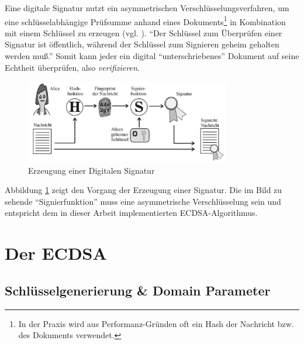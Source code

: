 Eine digitale Signatur nutzt ein asymmetrischen Verschlüsselungsverfahren, um eine schlüsselabhängige Prüfsumme anhand eines Dokuments\footnote{In der Praxis wird aus Performanz-Gründen oft ein Hash der Nachricht bzw. des Dokuments verwendet.} in Kombination mit einem Schlüssel zu erzeugen (vgl. \cite{wolf}). ``Der Schlüssel zum Überprüfen einer Signatur ist öffentlich, während der Schlüssel zum Signieren geheim gehalten werden muß.'' Somit kann jeder ein digital ``unterschriebenes'' Dokument auf seine Echtheit überprüfen, also \textit{verifizieren}. \\

\begin{figure}[H]
	\centering
   \includegraphics[width=0.80\textwidth]{bilder/digisig}
	\caption{Erzeugung einer Digitalen Signatur}
	\label{fig:digisig}
\end{figure}

Abbildung \ref{fig:digisig} zeigt den Vorgang der Erzeugung einer Signatur. Die im Bild zu sehende ``Signierfunktion'' muss eine asymmetrische Verschlüsselung sein und entspricht dem in dieser Arbeit implementierten ECDSA-Algorithmus. \\

\section{Der ECDSA}


\subsection{Schlüsselgenerierung \& Domain Parameter}

